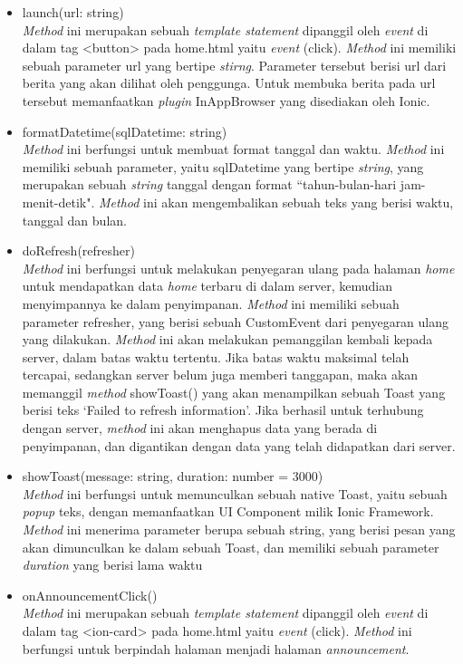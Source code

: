 \begin{itemize}
\begin{itemize}
		\item launch(url: string) \\
		\textit{Method} ini merupakan sebuah \textit{template statement} dipanggil oleh \textit{event} di dalam tag <button> pada home.html yaitu \textit{event} (click). \textit{Method} ini memiliki sebuah parameter url yang bertipe \textit{stirng}. Parameter tersebut berisi url dari berita yang akan dilihat oleh penggunga. Untuk membuka berita pada url tersebut memanfaatkan \textit{plugin} InAppBrowser yang disediakan oleh Ionic. 
		\item formatDatetime(sqlDatetime: string) \\
		\textit{Method} ini berfungsi untuk membuat format tanggal dan waktu. \textit{Method} ini memiliki sebuah parameter, yaitu sqlDatetime yang bertipe \textit{string}, yang merupakan sebuah \textit{string} tanggal dengan format ``tahun-bulan-hari jam-menit-detik". \textit{Method} ini akan mengembalikan sebuah teks yang berisi waktu, tanggal dan bulan.
		\item doRefresh(refresher) \\
		\textit{Method} ini berfungsi untuk melakukan penyegaran ulang pada halaman \textit{home} untuk mendapatkan data \textit{home} terbaru di dalam server, kemudian menyimpannya ke dalam penyimpanan. \textit{Method} ini memiliki sebuah parameter refresher, yang berisi sebuah CustomEvent dari penyegaran ulang yang dilakukan. \textit{Method} ini akan melakukan pemanggilan kembali kepada server, dalam batas waktu tertentu. Jika batas waktu maksimal telah tercapai, sedangkan server belum juga memberi tanggapan, maka akan memanggil \textit{method} showToast() yang akan menampilkan sebuah Toast yang berisi teks `Failed to refresh information'. Jika berhasil untuk terhubung dengan server, \textit{method} ini akan menghapus data yang berada di penyimpanan, dan digantikan dengan data yang telah didapatkan dari server.
		\item showToast(message: string, duration: number = 3000) \\
		\textit{Method} ini berfungsi untuk memunculkan sebuah native Toast, yaitu sebuah \textit{popup} teks, dengan memanfaatkan UI Component milik Ionic Framework. \textit{Method} ini menerima parameter berupa sebuah string, yang berisi pesan yang akan dimunculkan ke dalam sebuah Toast, dan memiliki sebuah parameter \textit{duration} yang berisi lama waktu   
		\item onAnnouncementClick() \\
		\textit{Method} ini merupakan sebuah \textit{template statement} dipanggil oleh \textit{event} di dalam tag <ion-card> pada home.html yaitu \textit{event} (click). \textit{Method} ini berfungsi untuk berpindah halaman menjadi halaman \textit{announcement}.
	\end{itemize}
	

\end{itemize}
